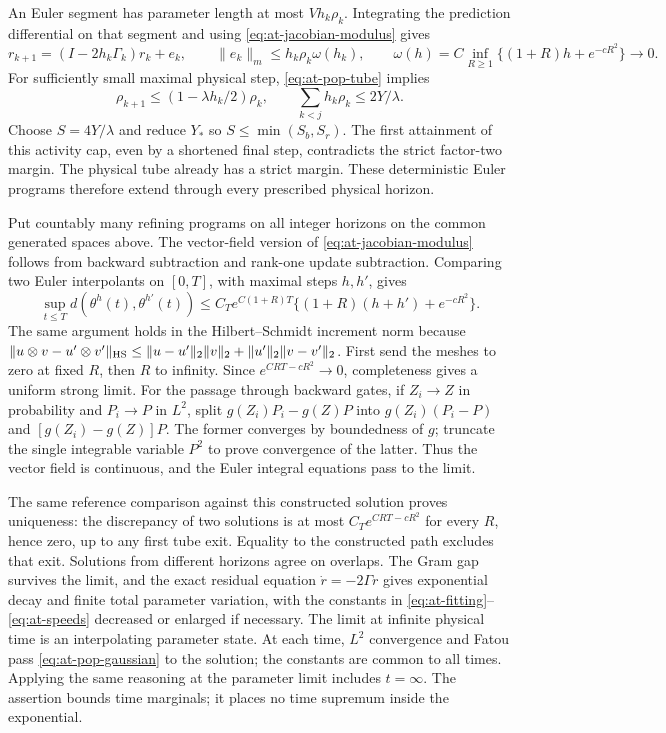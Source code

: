 An Euler segment has parameter length at most $Vh_k\rho_k$.
Integrating the prediction differential on that segment and using
\eqref{eq:at-jacobian-modulus} gives
\[
 r_{k+1}=(I-2h_k\Gamma_k)r_k+e_k,\qquad
 \|e_k\|_m\le h_k\rho_k\omega(h_k),\qquad
 \omega(h)=C\inf_{R\ge1}\{(1+R)h+e^{-cR^2}\}\longrightarrow0.
\]
For sufficiently small maximal physical step,
\eqref{eq:at-pop-tube} implies
\[
 \rho_{k+1}\le(1-\lambda h_k/2)\rho_k,\qquad
 \sum_{k<j}h_k\rho_k\le2Y/\lambda.
\]
Choose $S=4Y/\lambda$ and reduce $Y_*$ so
$S\le\min(S_b,S_r)$.
The first attainment of this activity cap, even by a shortened final
step, contradicts the strict factor-two margin.  The physical tube
already has a strict margin.  These deterministic Euler programs
therefore extend through every prescribed physical horizon.

Put countably many refining programs on all integer horizons on the
common generated spaces above.  The vector-field version of
\eqref{eq:at-jacobian-modulus} follows from backward subtraction and
rank-one update subtraction.  Comparing two Euler interpolants on
$[0,T]$, with maximal steps $h,h'$, gives
\begin{equation}
 \sup_{t\le T}d(\theta^h(t),\theta^{h'}(t))
 \le C_Te^{C(1+R)T}
       \{(1+R)(h+h')+e^{-cR^2}\}.
 \label{eq:at-pop-cauchy}
\end{equation}
The same argument holds in the Hilbert--Schmidt increment norm because
$\|u\otimes v-u'\otimes v'\|_{\rm HS}
\le\|u-u'\|_2\|v\|_2+\|u'\|_2\|v-v'\|_2$.
First send the meshes to zero at fixed $R$, then $R$ to infinity.
Since $e^{CRT-cR^2}\to0$, completeness gives a uniform strong limit.
For the passage through backward gates, if $Z_i\to Z$ in probability
and $P_i\to P$ in $L^2$, split
$g(Z_i)P_i-g(Z)P$ into $g(Z_i)(P_i-P)$ and
$[g(Z_i)-g(Z)]P$.  The former converges by boundedness of $g$;
truncate the single integrable variable $P^2$ to prove convergence of
the latter.  Thus the vector field is continuous, and the Euler
integral equations pass to the limit.

The same reference comparison against this constructed solution proves
uniqueness: the discrepancy of two solutions is at most
$C_Te^{CRT-cR^2}$ for every $R$, hence zero, up to any first tube exit.
Equality to the constructed path excludes that exit.  Solutions from
different horizons agree on overlaps.  The Gram gap survives the limit,
and the exact residual equation $\dot r=-2\Gamma r$ gives exponential
decay and finite total parameter variation, with the constants in
\eqref{eq:at-fitting}--\eqref{eq:at-speeds} decreased or enlarged if
necessary.  The limit at infinite physical time is an interpolating
parameter state.  At each time, $L^2$ convergence and Fatou pass
\eqref{eq:at-pop-gaussian} to the solution; the constants are common to
all times.  Applying the same reasoning at the parameter limit includes
$t=\infty$.  The assertion bounds time marginals; it places no time
supremum inside the exponential.

